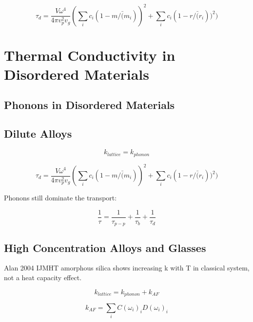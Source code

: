 \documentclass[letterpaper,12pt]{article}
\begin{document}
\begin{equation}\label{EQ:M:tau_d}
\tau_{d} = \frac{V \omega^4}{4 \pi v_p^2 v_g} ( \sum_i c_i(1-m/\bar(m_i))^2 + \sum_i c_i(1-r/\bar(r_i))^2 )
\end{equation}


\section*{Thermal Conductivity in Disordered Materials}

\subsection{\label{S-validation-samples}Phonons in Disordered Materials}

\subsection{\label{S-validation}Dilute Alloys}


\begin{equation}\label{EQ:M:k_thermal}
k_{lattice} = k_{phonon}
\end{equation}

\begin{equation}\label{EQ:M:tau_d}
\tau_{d} = \frac{V \omega^4}{4 \pi v_p^2 v_g} ( \sum_i c_i(1-m/\bar(m_i))^2 + \sum_i c_i(1-r/\bar(r_i))^2 )
\end{equation}

Phonons still dominate the transport:

\begin{equation}\label{EQ:M:tau_matthiessen}
\frac{1}{\tau} = \frac{1}{\tau_{p-p}} + \frac{1}{\tau_{b}} + \frac{1}{\tau_{d}}
\end{equation}


\subsection{\label{S-validation}High Concentration Alloys and Glasses}

Alan 2004 IJMHT amorphous silica shows increasing k with T in classical system, not a heat capacity effect.

\begin{equation}\label{EQ:M:k_thermal}
k_{lattice} = k_{phonon} + k_{AF}
\end{equation}

\begin{equation}\label{EQ:M:k_thermal}
k_{AF} = \sum_i C(\omega_i)_{i} D(\omega_i)_{i} 
\end{equation}
\end{document}
